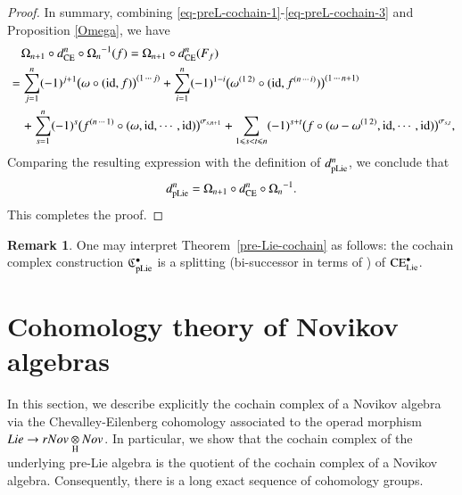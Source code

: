 \documentclass[12pt]{amsart}
\theoremstyle{definition}
\newtheorem{rmk}[thm]{Remark}
\newcommand{\frkC}{\mathfrak C}
\newcommand{\id}{\mathrm{id}}
\newcommand{\ot}{\otimes}
\newcommand{\ce}{{\rm CE}}
\newcommand{\pl}{{\rm pLie}}
\begin{document}
\begin{proof}
	In summary, combining \eqref{eq-preL-cochain-1}-\eqref{eq-preL-cochain-3} and Proposition \ref{Omega}, we have
	\begin{align*}
	&\quad\Omega_{n+1}\circ d^n_\ce\circ{\Omega_{n}}^{-1}(f)=\Omega_{n+1}\circ d^n_\ce(F_f)\\
		&=\sum\limits_{j=1}^{n} (-1)^{j+1}\bigl(\omega\circ(\id, f)\bigr)^{(1\,\cdots\,j)}+\sum\limits_{i=1}^n (-1)^{1-i}  \bigl(\omega^{(1\,2)}\circ (\id,f^{(n\,\cdots\,i)})\bigr)^{(1\,\cdots\,n+1)}\\
		&\quad+\sum\limits_{s=1}^n (-1)^{s} \bigl(f^{(n\,\cdots\,1)}\circ(\omega,\id,\cdots,\id)\bigr)^{\sigma_{s,n+1}}+\sum\limits_{1\leqslant s<t\leqslant n}(-1)^{s+t}  \bigl(f\circ(\omega-\omega^{(1\,2)},\id,\cdots,\id)\bigr)^{\sigma_{s,t}},
	\end{align*}
Comparing the resulting expression with the definition of \(d_{\pl}^n\), we conclude that
$$
d_{\pl}^n
=
\Omega_{n+1}\circ d_{\rm CE}^n\circ{\Omega_n}^{-1}.
$$
This completes the proof.
\end{proof}


\begin{rmk}
One may interpret  Theorem~\ref{pre-Lie-cochain} as follows:
the cochain complex construction $\frkC_{\pl}^\bullet $
is a splitting (bi-successor in terms of \cite{BBGN2013})
of ${\rm CE}^\bullet_{\rm Lie} $.
\end{rmk}


\section{Cohomology theory of Novikov algebras}\label{sec:nov}
In this section, we describe explicitly the cochain complex of a Novikov algebra via the Chevalley-Eilenberg cohomology associated to the operad morphism $Lie \to rNov\underset{\rm H}{\ot} Nov$.
In particular, we show that the cochain complex of the underlying pre-Lie algebra is the quotient of the cochain complex of a Novikov algebra. Consequently, there is a long exact sequence of cohomology groups.
\end{document}
